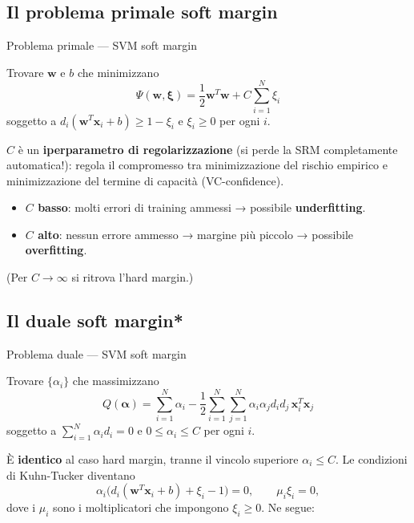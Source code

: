 \subsection{Il problema primale soft
margin}\label{il-problema-primale-soft-margin}

\begin{boxdefinition}{Problema primale --- SVM soft margin}

Trovare \(\mathbf{w}\) e \(b\) che minimizzano \[
\Psi(\mathbf{w}, \boldsymbol{\xi}) = \frac{1}{2}\mathbf{w}^T\mathbf{w} + C\sum_{i=1}^{N}\xi_i
\] soggetto a \(d_i(\mathbf{w}^T\mathbf{x}_i + b) \ge 1 - \xi_i\) e
\(\xi_i \ge 0\) per ogni \(i\).

\end{boxdefinition}

\(C\) è un \textbf{iperparametro di regolarizzazione} (si perde la SRM
completamente automatica!): regola il compromesso tra minimizzazione del
rischio empirico e minimizzazione del termine di capacità
(VC-confidence).

\begin{itemize}
\tightlist
\item
  \textbf{\(C\) basso}: molti errori di training ammessi → possibile
  \textbf{underfitting}.
\item
  \textbf{\(C\) alto}: nessun errore ammesso → margine più piccolo →
  possibile \textbf{overfitting}.
\end{itemize}

(Per \(C \to \infty\) si ritrova l'hard margin.)

\subsection{Il duale soft margin*}\label{il-duale-soft-margin}

\begin{boxdefinition}{Problema duale --- SVM soft margin}

Trovare \(\{\alpha_i\}\) che massimizzano \[
Q(\boldsymbol{\alpha}) = \sum_{i=1}^{N}\alpha_i - \frac{1}{2}\sum_{i=1}^{N}\sum_{j=1}^{N}\alpha_i\alpha_j d_i d_j\,\mathbf{x}_i^T\mathbf{x}_j
\] soggetto a \(\sum_{i=1}^{N}\alpha_i d_i = 0\) e
\(0 \le \alpha_i \le C\) per ogni \(i\).

\end{boxdefinition}

È \textbf{identico} al caso hard margin, tranne il vincolo superiore
\(\alpha_i \le C\). Le condizioni di Kuhn-Tucker diventano \[
\alpha_i\big(d_i(\mathbf{w}^T\mathbf{x}_i + b) + \xi_i - 1\big) = 0, \qquad \mu_i\xi_i = 0,
\] dove i \(\mu_i\) sono i moltiplicatori che impongono \(\xi_i \ge 0\).
Ne segue:

